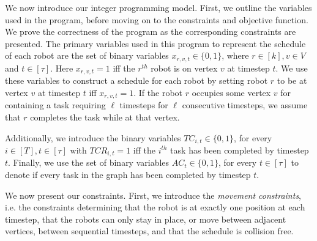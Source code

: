 \documentclass{DAC}
\begin{document}

We now introduce our integer programming model. First, we outline the variables used in the program, before moving on to the constraints and objective function. We prove the correctness of the program as the corresponding constraints are presented.
The primary variables used in this program to represent the schedule of each robot are the set of binary variables $x_{r, v, t} \in \{0, 1\}$, where $r \in [k], v \in V$ and $t \in [\tau]$. Here $x_{r, v, t} = 1$ iff the $r^{th}$ robot is on vertex $v$ at timestep $t$. We use these variables to construct a schedule for each robot by setting robot $r$ to be at vertex $v$ at timestep $t$ iff $x_{r, v, t} = 1$. If the robot $r$ occupies some vertex $v$ for containing a task requiring $\ell$ timesteps for $\ell$ consecutive timesteps, we assume that $r$ completes the task while at that vertex.

Additionally, we introduce the binary variables $TC_{i, t} \in \{0, 1\}$, for every $i \in [T], t \in [\tau]$ with $TCR_{i, t} = 1$ iff the $i^{th}$ task has been completed by timestep $t$. Finally, we use the set of binary variables $AC_{t} \in \{0, 1\}$, for every $t \in [\tau]$ to denote if every task in the graph has been completed by timestep $t$.


We now present our constraints. First, we introduce the \emph{movement constraints}, i.e. the constraints determining that the robot is at exactly one position at each timestep, that the robots can only stay in place, or move between adjacent vertices, between sequential timesteps, and that the schedule is collision free.
\end{document}
